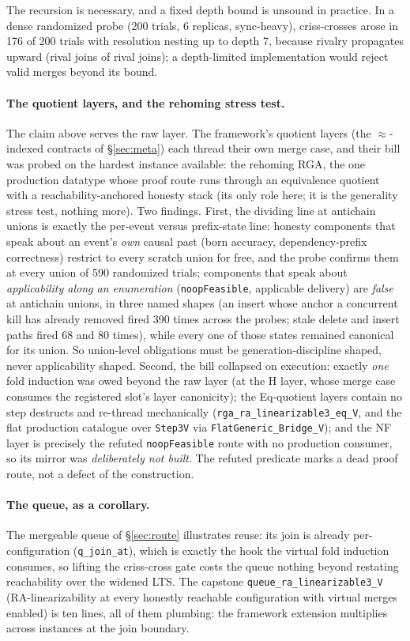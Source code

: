 \documentclass[11pt]{article}
\newcommand{\lean}[1]{\texttt{#1}}
\newcommand{\eqobs}{\approx}
\begin{document}
The recursion is necessary, and a fixed depth bound is unsound in
practice. In a dense
randomized probe (200 trials, 6 replicas, sync-heavy), criss-crosses
arose in 176 of 200 trials with resolution nesting up to depth 7,
because rivalry propagates upward (rival joins of rival joins); a
depth-limited implementation would reject valid merges beyond its bound.

\paragraph{The quotient layers, and the rehoming stress test.} The
claim above serves the raw layer. The framework's quotient layers
(the $\eqobs$-indexed contracts of \S\ref{sec:meta}) each thread their
own merge case, and their bill was probed on the hardest instance
available: the rehoming RGA, the one production datatype whose proof
route runs through an equivalence quotient with a
reachability-anchored honesty stack (its only role here; it is the
generality stress test, nothing more). Two findings. First, the
dividing line at antichain unions is exactly the per-event versus
prefix-state line: honesty components that speak about an event's
\emph{own} causal past (born accuracy, dependency-prefix correctness)
restrict to every scratch union for free, and the probe confirms them
at every union of 590 randomized trials; components that speak about
\emph{applicability along an enumeration} (\lean{noopFeasible},
applicable delivery) are \emph{false} at antichain unions, in three
named shapes (an insert whose anchor a concurrent kill has already
removed fired 390 times across the probes; stale delete and insert
paths fired 68 and 80 times), while every one of those states remained
canonical for its union. So union-level obligations must be
generation-discipline shaped, never applicability shaped. Second, the
bill collapsed on execution: exactly \emph{one} fold induction was owed
beyond the raw layer (at the H layer, whose merge case consumes the
registered slot's layer canonicity); the Eq-quotient layers contain no
step destructs and re-thread mechanically
(\lean{rga\_ra\_linearizable3\_eq\_V}, and the flat production
catalogue over \lean{Step3V} via \lean{FlatGeneric\_Bridge\_V}); and
the NF layer is precisely the refuted \lean{noopFeasible} route with no
production consumer, so its mirror was \emph{deliberately not built}.
The refuted predicate marks a dead proof route, not a defect of the
construction.

\paragraph{The queue, as a corollary.} The mergeable queue of
\S\ref{sec:route} illustrates reuse: its join is already
per-configuration (\lean{q\_join\_at}), which is exactly the hook the
virtual fold induction consumes, so lifting the criss-cross gate costs
the queue nothing beyond restating reachability over the widened LTS.
The capstone \lean{queue\_ra\_linearizable3\_V} (RA-linearizability at
every honestly reachable configuration with virtual merges enabled) is
ten lines, all of them plumbing: the framework extension multiplies
across instances at the join boundary.
\end{document}
